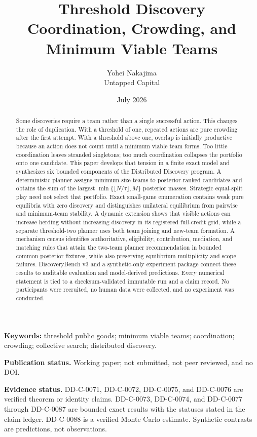 \documentclass[11pt]{article}
\title{\textbf{Threshold Discovery}\\[0.35em]\large Coordination, Crowding, and Minimum Viable Teams}
\author{Yohei Nakajima\\Untapped Capital}
\date{July 2026}
\newcommand{\Evidence}[1]{\par\noindent\textbf{Evidence status.} #1\par}
\begin{document}
\maketitle

\begin{abstract}
Some discoveries require a team rather than a single successful action. This
changes the role of duplication. With a threshold of one, repeated actions are
pure crowding after the first attempt. With a threshold above one, overlap is
initially productive because an action does not count until a minimum viable
team forms. Too little coordination leaves stranded singletons; too much
coordination collapses the portfolio onto one candidate. This paper develops
that tension in a finite exact model and synthesizes six bounded components of
the Distributed Discovery program. A deterministic planner assigns minimum-size
teams to posterior-ranked candidates and obtains the sum of the largest
$\min\{\lfloor N/\tau\rfloor,M\}$ posterior masses. Strategic equal-split play
need not select that portfolio. Exact small-game enumeration contains weak pure
equilibria with zero discovery and distinguishes unilateral equilibrium from
pairwise and minimum-team stability. A dynamic extension shows that visible
actions can increase herding without increasing discovery in its registered
full-credit grid, while a separate threshold-two planner uses both team joining
and new-team formation. A mechanism census identifies authoritative,
eligibility, contribution, mediation, and matching rules that attain the
two-team planner recommendation in bounded common-posterior fixtures, while
also preserving equilibrium multiplicity and scope failures. DiscoveryBench v3
and a synthetic-only experiment package connect these results to auditable
evaluation and model-derived predictions. Every numerical statement is tied to
a checksum-validated immutable run and a claim record. No participants were
recruited, no human data were collected, and no experiment was conducted.
\end{abstract}

\noindent\textbf{Keywords:} threshold public goods; minimum viable teams;
coordination; crowding; collective search; distributed discovery.
\par\noindent\textbf{Publication status.} Working paper; not submitted, not
peer reviewed, and no DOI.

\Evidence{DD-C-0071, DD-C-0072, DD-C-0075, and DD-C-0076 are verified
theorem or identity claims. DD-C-0073, DD-C-0074, and DD-C-0077 through
DD-C-0087 are bounded exact results with the statuses stated in the claim
ledger. DD-C-0088 is a verified Monte Carlo estimate. Synthetic contrasts are
predictions, not observations.}
\end{document}
